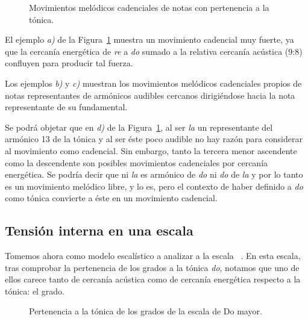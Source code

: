 \documentclass[a4paper,12pt]{article}
\begin{document}
\begin{figure}[ht]
\centering
{}
\caption{Movimientos melódicos cadenciales de notas con pertenencia a la tónica.}\label{fig:mov-cad}
\end{figure}

\begin{multicols}{2}
  El ejemplo \emph{a)} de la Figura~\ref{fig:mov-cad} muestra un movimiento cadencial muy fuerte, ya que la cercanía energética de \emph{re} a \emph{do} sumado a la relativa cercanía acústica (9:8) confluyen para producir tal fuerza.

  Los ejemplos \emph{b)} y \emph{c)} muestran los movimientos melódicos cadenciales propios de notas representantes de armónicos audibles cercanos dirigiéndose hacia la nota representante de su fundamental.

  Se podrá objetar que en \emph{d)} de la Figura~\ref{fig:mov-cad}, al ser \emph{la} un representante del armónico 13 de la tónica y al ser éste poco audible no hay razón para considerar al movimiento  como cadencial. Sin embargo, tanto la tercera menor ascendente como la descendente son posibles movimientos cadenciales por cercanía energética. Se podría decir que ni \emph{la} es armónico de \emph{do} ni \emph{do} de \emph{la} y por lo tanto es un movimiento melódico libre, y lo es, pero el contexto de haber definido a \emph{do} como tónica convierte a éste en un movimiento cadencial.

    \subsection{Tensión interna en una escala}\label{subsec:tension}

    Tomemos ahora como modelo escalístico a analizar a la escala \hbox{ .} En esta escala, tras comprobar la pertenencia de los grados a la tónica \emph{do}, notamos que uno de ellos carece tanto de cercanía acústica como de cercanía energética respecto a la tónica: el  grado.
\end{multicols}

\begin{figure}[ht]
\centering
{}
\caption{Pertenencia a la tónica de los grados de la escala de Do mayor. }\label{fig:pertenencia-do}
\end{figure}
\end{document}

